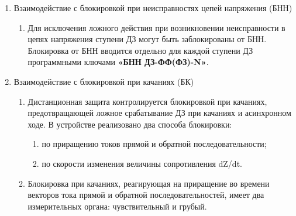 \begin{enumerate}[label=\arabic{section}.\arabic{subsection}.\arabic{enumi}, labelsep=4pt, leftmargin=0pt, itemindent=57pt, itemsep=0pt, parsep=5pt]
\begin{enumerate}[label=\arabic{section}.\arabic{subsection}.\arabic{enumi}.\arabic*, labelsep=4pt, leftmargin=0em, itemindent=65pt, parsep=0pt]
\item
Уставки ступеней ДЗ от однофазных КЗ (ДЗ-ФЗ-4, ДЗ-ФЗ-5) представлены в таблице \ref{app_set:dz}.


\end{enumerate}


\item\label{sec:secbnn} Взаимодействие с блокировкой при неисправностях цепей напряжения (БНН)
\begin{enumerate}[label=\arabic{section}.\arabic{subsection}.\arabic{enumi}.\arabic*, labelsep=4pt, leftmargin=0em, itemindent=65pt, parsep=0pt]

\item
Для исключения ложного действия при возникновении неисправности в цепях напряжения ступени ДЗ могут быть заблокированы от БНН. Блокировка от БНН вводится отдельно для каждой ступени ДЗ программными ключами \textbf{«БНН ДЗ-ФФ(ФЗ)-N»}.

\end{enumerate}


\item\label{sec:secbk} Взаимодействие с блокировкой при качаниях (БК)
\begin{enumerate}[label=\arabic{section}.\arabic{subsection}.\arabic{enumi}.\arabic*, labelsep=4pt, leftmargin=0em, itemindent=65pt, parsep=0pt]

\item
Дистанционная защита контролируется блокировкой при качаниях, предотвращающей ложное срабатывание ДЗ при качаниях и асинхронном ходе. В устройстве реализовано два способа блокировки:
\begin{enumerate}[label=\arabic*)]
    \item по приращению токов прямой и обратной последовательности;
    \item по скорости изменения величины сопротивления dZ/dt.
\end{enumerate}

\item
Блокировка при качаниях, реагирующая на приращение во времени векторов тока прямой и обратной последовательностей, имеет два измерительных органа: чувствительный и грубый.


\end{enumerate}
\end{enumerate}
